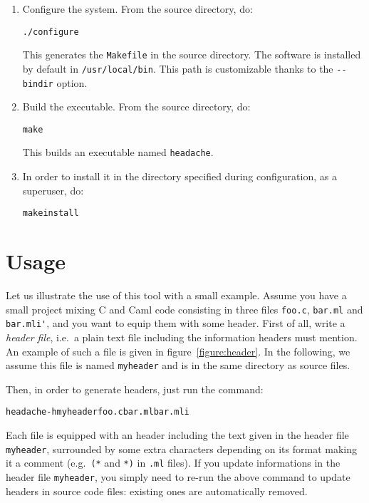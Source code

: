\documentclass{vs-article}
\newcommand{\headache}{\texttt{headache}}
\begin{document}
\begin{enumerate}
\item Configure the system.  From the source directory, do:
\begin{alltt}
  ./configure
\end{alltt}
This generates the \verb+Makefile+ in the source directory.  The
software is installed by default in \verb+/usr/local/bin+.  This path
is customizable thanks to the \verb+--bindir+ option.

\item Build the executable.  From the source directory, do:
\begin{alltt}
  make
\end{alltt}  
  This builds an executable named \headache{}.  
  
\item In order to install it in the directory specified during
  configuration, as a superuser, do:
\begin{alltt}
  make install
\end{alltt}
\end{enumerate}


\section{Usage}

Let us illustrate the use of this tool with a small example.  Assume
you have a small project mixing C and Caml code consisting in three
files \verb+foo.c+, \verb+bar.ml+ and \verb+bar.mli'+, and you want to
equip them with some header.  First of all, write a \emph{header
  file}, i.e.\ a plain text file including the information headers
must mention.  An example of such a file is given in
figure~\ref{figure:header}.  In the following, we assume this file is
named \verb+myheader+ and is in the same directory as source files.

Then, in order to generate headers, just run the command:
\begin{alltt}
  headache -h myheader foo.c bar.ml bar.mli
\end{alltt}
Each file is equipped with an header including the text given in the
header file \verb+myheader+, surrounded by some extra characters
depending on its format making it a comment (e.g.\ \verb+(*+ and
\verb+*)+ in \verb+.ml+ files).  If you update informations in the
header file \verb+myheader+, you simply need to re-run the above
command to update headers in source code files: existing ones are
automatically removed.
\end{document}
